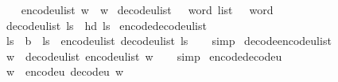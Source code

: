 \begin{isabellebody}
\ \ \isanewline
\ \ {\isachardoublequoteopen}encode{\isacharunderscore}{\kern0pt}u{}{\isacharunderscore}{\kern0pt}list\ w\ {\isasymequiv}\ {\isacharbrackleft}{\kern0pt}w{\isacharbrackright}{\kern0pt}{\isachardoublequoteclose}\isanewline
\isanewline
{}\isamarkupfalse%
\ decode{\isacharunderscore}{\kern0pt}u{}{\isacharunderscore}{\kern0pt}list\ {\isacharcolon}{\kern0pt}{\isacharcolon}{\kern0pt}\ {\isachardoublequoteopen}{}\ word\ list\ {\isasymRightarrow}\ {}\ word{\isachardoublequoteclose}\isanewline
\ \ \isanewline
\ \ {\isachardoublequoteopen}decode{\isacharunderscore}{\kern0pt}u{}{\isacharunderscore}{\kern0pt}list\ ls\ {\isasymequiv}\ hd\ ls{\isachardoublequoteclose}\isanewline
\isanewline
{}\isamarkupfalse%
\ encode{\isacharunderscore}{\kern0pt}decode{\isacharunderscore}{\kern0pt}u{}{\isacharunderscore}{\kern0pt}list{\isacharcolon}{\kern0pt}\isanewline
\ \ {\isachardoublequoteopen}ls\ {\isacharequal}{\kern0pt}\ {\isacharbrackleft}{\kern0pt}b{\isacharbrackright}{\kern0pt}\ {\isasymLongrightarrow}\ ls\ {\isacharequal}{\kern0pt}\ encode{\isacharunderscore}{\kern0pt}u{}{\isacharunderscore}{\kern0pt}list\ {\isacharparenleft}{\kern0pt}decode{\isacharunderscore}{\kern0pt}u{}{\isacharunderscore}{\kern0pt}list\ ls{\isacharparenright}{\kern0pt}{\isachardoublequoteclose}\isanewline
%
\isadelimproof
\ \ %
\endisadelimproof
%
\isatagproof
{}\isamarkupfalse%
\ simp%
\endisatagproof
{\isafoldproof}%
%
\isadelimproof
\isanewline
%
\endisadelimproof
\isanewline
{}\isamarkupfalse%
\ decode{\isacharunderscore}{\kern0pt}encode{\isacharunderscore}{\kern0pt}u{}{\isacharunderscore}{\kern0pt}list{\isacharcolon}{\kern0pt}\isanewline
\ \ {\isachardoublequoteopen}w\ {\isacharequal}{\kern0pt}\ decode{\isacharunderscore}{\kern0pt}u{}{\isacharunderscore}{\kern0pt}list\ {\isacharparenleft}{\kern0pt}encode{\isacharunderscore}{\kern0pt}u{}{\isacharunderscore}{\kern0pt}list\ w{\isacharparenright}{\kern0pt}{\isachardoublequoteclose}\isanewline
%
\isadelimproof
\ \ %
\endisadelimproof
%
\isatagproof
{}\isamarkupfalse%
\ simp%
\endisatagproof
{\isafoldproof}%
%
\isadelimproof
\isanewline
%
\endisadelimproof
\isanewline
{}\isamarkupfalse%
\ encode{\isacharunderscore}{\kern0pt}decode{\isacharunderscore}{\kern0pt}u{}{\isacharcolon}{\kern0pt}\isanewline
\ \ {\isachardoublequoteopen}w\ {\isacharequal}{\kern0pt}\ encode{\isacharunderscore}{\kern0pt}u{}\ {\isacharparenleft}{\kern0pt}decode{\isacharunderscore}{\kern0pt}u{}\ w{\isacharparenright}{\kern0pt}{\isachardoublequoteclose}\isanewline

\end{isabellebody}
